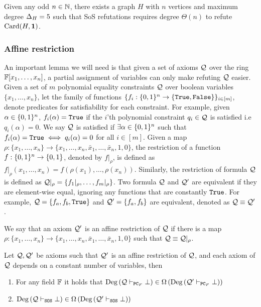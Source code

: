 \documentclass[11pt]{article}
\begin{document}
\begin{lemma}\label{lemma:worst-case-instance-sos}
Given any odd $n \in \mathbb{N}$, there exists a graph $H$ with $n$ vertices and maximum degree $\Delta_{H}= 5$ such that SoS refutations requires degree $\Theta(n)$ to refute $\text{Card}(H, \mathbf{1})$.
\end{lemma}

\subsubsection{Affine restriction} 

An important lemma we will need is that given a set of axioms $\mathcal{Q}$ over the ring $\mathbb{F}[x_1, \dots, x_n]$, a partial assignment of variables can only make refuting $\mathcal{Q}$ easier.
Given a set of $m$ polynomial equality constraints $\mathcal{Q}$ over boolean variables $\{x_1, \dots, x_n\}$, let the family of functions $\{f_i: \{0,1\}^n \rightarrow \{\texttt{True},\texttt{False}\} \}_{i \in [m]}$, denote predicates for satisfiability for each constraint.
For example, given $\alpha \in \{0,1\}^n$, $f_i(\alpha) = \texttt{True}$ if the $i$'th polynomial constraint $q_i \in \mathcal{Q}$ is satisfied i.e $q_i(\alpha) = 0$.
We say $\mathcal{Q}$ is satisfied if $\exists \alpha \in \{0,1\}^n$ such that $f_i(\alpha) = \texttt{True} \iff q_i(\alpha)=0$ for all $i \in [m]$.
Given a map $\rho: \{x_1, \dots, x_n \} \rightarrow \{x_1, \dots, x_n, \bar{x}_1, \dots, \bar{x}_n, 1, 0 \}$, the restriction of a function $f: \{0,1\}^n \rightarrow \{0,1\}$, denoted by $f|_\rho$, is defined as $f|_\rho(x_1, \dots, x_n) = f(\rho(x_1), \dots, \rho(x_n))$.
Similarly, the restriction of formula $\mathcal{Q}$ is defined as $\mathcal{Q}|_\rho = \{f_{1}|_\rho, \dots, f_{m}|_\rho \}$.
Two formula $\mathcal{Q}$ and $\mathcal{Q}'$ are equivalent if they are element-wise equal, ignoring any functions that are constantly $\texttt{True}$.
For example, $\mathcal{Q} = \{f_a, f_b, \texttt{True} \}$ and $\mathcal{Q}' = \{f_a, f_b\}$ are equivalent, denoted as $\mathcal{Q} \equiv \mathcal{Q}'$.


\begin{definition}\label{def:affine-restriction}
We say that an axiom $\mathcal{Q}'$ is an
affine restriction of $\mathcal{Q}$ if there is a map $\rho : \{x_1,\dots,x_n\} \rightarrow \{x_1, \dots, x_n, \bar{x}_1, \dots, \bar{x}_n, 1, 0 \}$ such that $\mathcal{Q} \equiv \mathcal{Q}|_{\rho}$.
\end{definition}


\begin{lemma}\label{lemma:affine_restriction}
Let $\mathcal{Q}, \mathcal{Q}'$ be axioms such that $\mathcal{Q}'$ is an affine restriction of $\mathcal{Q}$, and each axiom
of $\mathcal{Q}$ depends on a constant number of variables, then
\begin{enumerate}
	\item For any field $\mathbb{F}$ it holds that $\text{Deg}\left(\mathcal{Q} \vdash_{\texttt{PC}_F} \bot\right) \in \Omega\left(\text{Deg}\left(\mathcal{Q}' \vdash_{\texttt{PC}_F} \bot\right)\right)$
	\item $\text{Deg}\left(\mathcal{Q} \vdash_{\texttt{SOS}} \bot\right) \in \Omega\left(\text{Deg}\left(\mathcal{Q}' \vdash_{\texttt{SOS}} \bot\right)\right)$
\end{enumerate}
\end{lemma}
\end{document}

